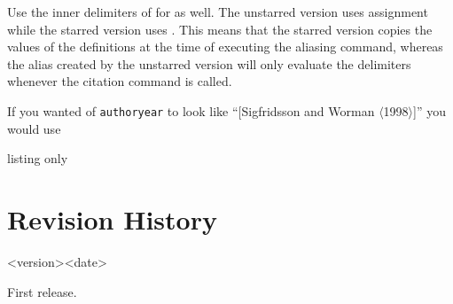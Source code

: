 \documentclass{ltxdockit}
\def\sty{\texttt}
\begin{document}
\begin{ltxsyntax}

Use the inner delimiters of  for
 as well.
The unstarred version uses  assignment while the starred version uses
. This means that the starred version copies the values of the
definitions at the time of executing the aliasing command,
whereas the alias created by the unstarred version will only evaluate the
delimiters whenever the citation command is called.

If you wanted  of \sty{authoryear} to look like
\enquote{[Sigfridsson and Worman $\langle$1998$\rangle$]} you would use
\begin{tcblisting}{listing only}
\end{tcblisting}
\begin{tcolorbox}
\parencite{sigfridsson}\quad\parencite{worman,geer}\quad
\parencite{knuth:ct:a,knuth:ct:b,knuth:ct:c}
\end{tcolorbox}
\end{ltxsyntax}

\section{Revision History}\label{apx:log}
\begin{changelog}
\begin{release}{<version>}{<date>}
\item First release.
\end{release}
\end{changelog}

\begin{tcolorbox}[breakable]
\printbibliography
\end{tcolorbox}
\end{document}
